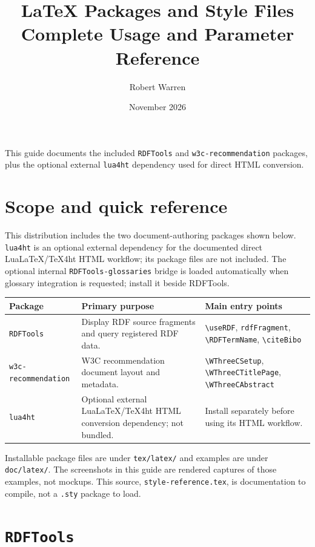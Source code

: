 \documentclass[10pt,letterpaper]{article}
\title{\Huge\color{ink}LaTeX Packages and Style Files\\[4pt]
  \Large Complete Usage and Parameter Reference}
\author{Robert Warren}
\date{November 2026}
\newcommand{\pkg}[1]{\texttt{#1}}
\begin{document}
\maketitle
\begin{center}
\large
This guide documents the included \pkg{RDFTools} and
\pkg{w3c-recommendation} packages, plus the optional external
\pkg{lua4ht} dependency used for direct HTML conversion.
\end{center}

\tableofcontents
\clearpage

\section{Scope and quick reference}

This distribution includes the two document-authoring packages shown below.
\pkg{lua4ht} is an optional external dependency for the documented direct
LuaLaTeX/TeX4ht HTML workflow; its package files are not included. The
optional internal \pkg{RDFTools-glossaries} bridge is loaded automatically
when glossary integration is requested; install it beside RDFTools.

\begin{longtable}{p{.23\linewidth}p{.29\linewidth}p{.39\linewidth}}
\textbf{Package} & \textbf{Primary purpose} & \textbf{Main entry points}\\
\hline
\pkg{RDFTools} & Display RDF source fragments and query registered RDF data. &
\verb|\useRDF|, \verb|rdfFragment|, \verb|\RDFTermName|, \verb|\citeBibo|\\
\pkg{w3c-recommendation} & W3C recommendation document layout and metadata. &
\verb|\WThreeCSetup|, \verb|\WThreeCTitlePage|, \verb|\WThreeCAbstract|\\
\pkg{lua4ht} & Optional external LuaLaTeX/TeX4ht HTML conversion dependency;
not bundled. & Install separately before using its HTML workflow.\\
\end{longtable}

Installable package files are under \verb|tex/latex/| and examples are under
\verb|doc/latex/|. The screenshots in this guide are rendered captures of
those examples, not mockups. This source, \texttt{style-reference.tex}, is
documentation to compile, not a \pkg{.sty} package to load.

\section{\pkg{RDFTools}}
\end{document}

